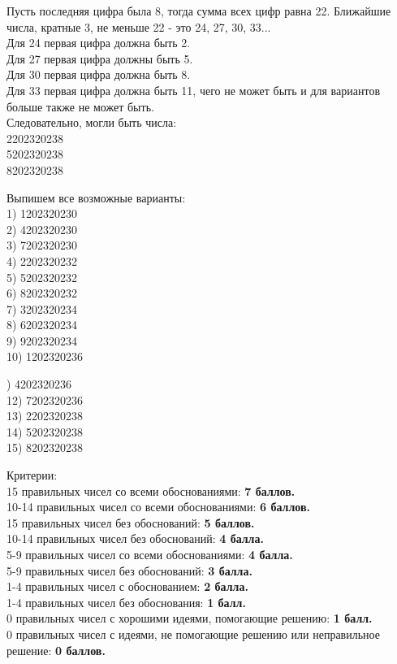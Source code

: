 Пусть последняя цифра была 8, тогда сумма всех цифр равна 22. Ближайшие числа, кратные 3, не меньше 22 - это 24, 27, 30, 33...\\
Для 24 первая цифра должна быть 2.\\
Для 27 первая цифра должны быть 5.\\
Для 30 первая цифра должна быть 8.\\
Для 33 первая цифра должна быть 11, чего не может быть и для вариантов больше также не может быть.\\
Следовательно, могли быть числа:\\
2202320238\\
5202320238\\
8202320238 

Выпишем все возможные варианты:\\
1) 1202320230\\
2) 4202320230\\
3) 7202320230\\
4) 2202320232\\
5) 5202320232\\
6) 8202320232\\ 
7) 3202320234\\
8) 6202320234\\
9) 9202320234\\ 
10) 1202320236

\newpage

\hspace{3mm}

) 4202320236\\
12) 7202320236\\ 
13) 2202320238\\
14) 5202320238\\
15) 8202320238 
 

Критерии:\\
15 правильных чисел со всеми обоснованиями: \textbf{7 баллов.}\\
10-14 правильных чисел со всеми обоснованиями: \textbf{6 баллов.}\\
15 правильных чисел без обоснований: \textbf{5 баллов.}\\
10-14 правильных чисел без обоснований: \textbf{4 балла.}\\
5-9 правильных чисел со всеми обоснованиями: \textbf{4 балла.}\\
5-9 правильных чисел без обоснований: \textbf{3 балла.}\\
1-4 правильных чисел с обоснованием: \textbf{2 балла.}\\
1-4 правильных чисел без обоснования: \textbf{1 балл.}\\
0 правильных чисел с хорошими идеями, помогающие решению: \textbf{1 балл.}\\
0 правильных чисел с идеями, не помогающие решению или неправильное решение: \textbf{0 баллов.}

